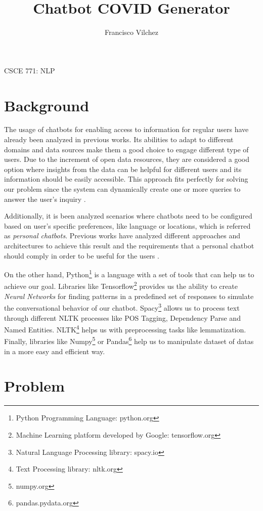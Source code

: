 \documentclass[]{article}
\title{Chatbot COVID Generator}
\author{Francisco Vilchez}
\makeatletter
\renewcommand\maketitle {
  \begin{center}
    {\Large{\course}}
    \medskip\par\noindent
    {\Large\textbf{\@title}}
    \medskip\par\noindent
    {\Large\@author}
    \medskip\par\noindent
    {\Large\@date}
    \bigskip\par\noindent
  \end{center}
}
\newcommand{\course}{CSCE 771: NLP}
\makeatother
\begin{document}
\maketitle


\section{Background}
The usage of chatbots for enabling access to information for regular users have already been analyzed in previous works. Its abilities to adapt to different domains and data sources make them a good choice to engage different type of users. Due to the increment of open data resources, they are considered a good option where insights from the data can be helpful for different users and its information should be easily accessible. This approach fits perfectly for solving our problem since the system can dynamically create one or more queries to answer the user's inquiry \cite{srivastava2018decision}.

Additionally, it is been analyzed scenarios where chatbots need to be configured based on user's specific preferences, like language or locations, which is referred as \emph{personal chatbots}. Previous works have analyzed different approaches and architectures to achieve this result and the requirements that a personal chatbot should comply in order to be useful for the users \cite{daniel2018toward}.

On the other hand, Python\footnote{Python Programming Language: python.org} is a language with a set of tools that can help us to achieve our goal. Libraries like Tensorflow\footnote{Machine Learning platform developed by Google: tensorflow.org} provides us the ability to create \emph{Neural Networks} for finding patterns in a predefined set of responses to simulate the conversational behavior of our chatbot. Spacy\footnote{Natural Language Processing library: spacy.io} allows us to process text through different NLTK processes like POS Tagging, Dependency Parse and Named Entities. NLTK\footnote{Text Processing library: nltk.org} helps us with preprocessing tasks like lemmatization. Finally, libraries like Numpy\footnote{numpy.org} or Pandas\footnote{pandas.pydata.org} help us to manipulate dataset of datas in a more easy and efficient way.


\section{Problem}
\end{document}
